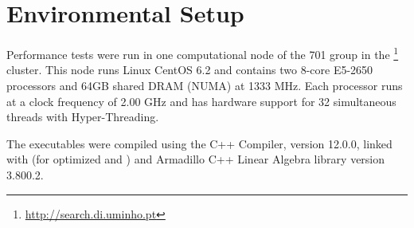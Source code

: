 \documentclass[../thesis]{subfiles}
\begin{document}
	\section{Environmental Setup}
	\label{sec:multicore:env}

	Performance tests were run in one computational node of the 701 group in the \search\footnote{\url{http://search.di.uminho.pt}} cluster. This node runs Linux CentOS 6.2 and contains two 8-core \intel\xeon E5-2650 processors and 64GB shared DRAM (NUMA) at 1333 MHz. Each processor runs at a clock frequency of 2.00 GHz and has hardware support for 32 simultaneous threads with \intel Hyper-Threading.

	The executables were compiled using the \intel C++ Compiler, version 12.0.0, linked with \intel{} (for optimized \blas and \lapack) and Armadillo C++ Linear Algebra library version 3.800.2.
\end{document}
